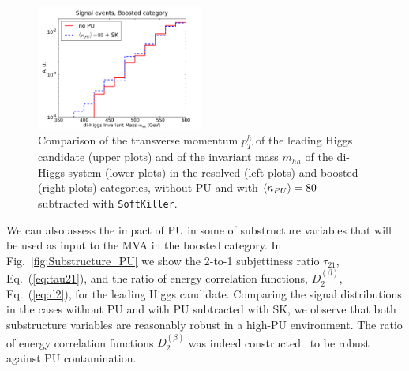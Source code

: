 \begin{figure}[t]
\begin{center}
  \includegraphics[width=0.49\textwidth]{plots/m_HH_C2_bst_comp.pdf}
  \caption{\small
    Comparison of the transverse momentum $p_T^h$ of the leading
    Higgs candidate (upper plots) and of the invariant mass $m_{hh}$
    of the di-Higgs system (lower plots) in the resolved
    (left plots) and boosted (right plots) categories,
    without PU and with $\left\langle n_{PU}\right\rangle=80$ subtracted with {\tt SoftKiller}.
}
\label{fig:mHH_PU}
\end{center}
\end{figure}

We can also assess the impact of PU in some of
substructure variables that will be 
used as input to the MVA in the boosted category.
%
In Fig.~\ref{fig:Substructure_PU} we show the 2-to-1 subjettiness ratio
$\tau_{21}$, Eq.~(\ref{eq:tau21}), and the ratio
of energy correlation functions, $D_2^{(\beta)}$,
Eq.~(\ref{eq:d2}), for the leading Higgs candidate.
%
Comparing the signal distributions in the cases without PU and
with PU subtracted with SK, we observe that both substructure variables
are reasonably robust in a high-PU environment.
%
The ratio of energy correlation functions $D_2^{(\beta)}$ 
was indeed constructed~\cite{Larkoski:2013eya}
to be robust against PU contamination.
%

